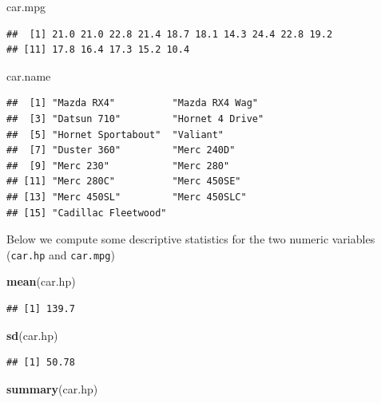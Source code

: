 \documentclass[
]{krantz}
\newenvironment{Shaded}{\begin{snugshade}}{\end{snugshade}}
\newcommand{\KeywordTok}[1]{\textcolor[rgb]{0.13,0.29,0.53}{\textbf{#1}}}
\newcommand{\NormalTok}[1]{#1}
\begin{document}
\begin{Shaded}
\begin{Highlighting}[]
\NormalTok{car.mpg}
\end{Highlighting}
\end{Shaded}

\begin{verbatim}
##  [1] 21.0 21.0 22.8 21.4 18.7 18.1 14.3 24.4 22.8 19.2
## [11] 17.8 16.4 17.3 15.2 10.4
\end{verbatim}

\begin{Shaded}
\begin{Highlighting}[]
\NormalTok{car.name}
\end{Highlighting}
\end{Shaded}

\begin{verbatim}
##  [1] "Mazda RX4"          "Mazda RX4 Wag"     
##  [3] "Datsun 710"         "Hornet 4 Drive"    
##  [5] "Hornet Sportabout"  "Valiant"           
##  [7] "Duster 360"         "Merc 240D"         
##  [9] "Merc 230"           "Merc 280"          
## [11] "Merc 280C"          "Merc 450SE"        
## [13] "Merc 450SL"         "Merc 450SLC"       
## [15] "Cadillac Fleetwood"
\end{verbatim}

Below we compute some descriptive statistics for the two numeric variables (\texttt{car.hp} and \texttt{car.mpg})

\begin{Shaded}
\begin{Highlighting}[]
\KeywordTok{mean}\NormalTok{(car.hp)}
\end{Highlighting}
\end{Shaded}

\begin{verbatim}
## [1] 139.7
\end{verbatim}

\begin{Shaded}
\begin{Highlighting}[]
\KeywordTok{sd}\NormalTok{(car.hp)}
\end{Highlighting}
\end{Shaded}

\begin{verbatim}
## [1] 50.78
\end{verbatim}

\begin{Shaded}
\begin{Highlighting}[]
\KeywordTok{summary}\NormalTok{(car.hp)}
\end{Highlighting}
\end{Shaded}
\end{document}
